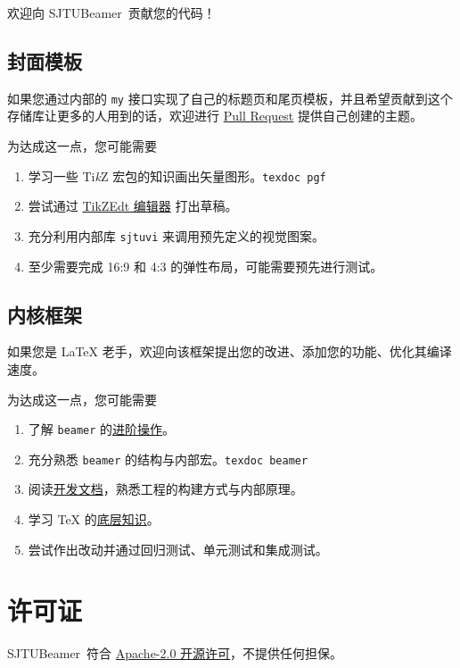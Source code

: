 \documentclass[
    UTF8,
    heading=true,
    12pt,
    a4paper
]{ctexrep}
\def\themename{\textsf{SJTUBeamer}}
\begin{document}
欢迎向 \themename\ 贡献您的代码！

\section{封面模板}

如果您通过内部的 \texttt{my} 接口实现了自己的标题页和尾页模板，并且希望贡献到这个存储库让更多的人用到的话，欢迎进行 \href{https://github.com/sjtug/SJTUBeamer/pulls}{Pull Request} 提供自己创建的主题。

为达成这一点，您可能需要
\begin{enumerate}
  \item 学习一些 Ti\textit{k}Z 宏包的知识画出矢量图形。\texttt{texdoc pgf}
  \item 尝试通过 \href{https://code.google.com/archive/p/tikzedt/downloads}{TikZEdt 编辑器} 打出草稿。
  \item 充分利用内部库 \texttt{sjtuvi} 来调用预先定义的视觉图案。
  \item 至少需要完成 16:9 和 4:3 的弹性布局，可能需要预先进行测试。
\end{enumerate}

\section{内核框架}

如果您是 \LaTeX{} 老手，欢迎向该框架提出您的改进、添加您的功能、优化其编译速度。

为达成这一点，您可能需要
\begin{enumerate}
  \item 了解 \texttt{beamer} 的\href{https://latex-beamer.com/}{进阶操作}。
  \item 充分熟悉 \texttt{beamer} 的结构与内部宏。\texttt{texdoc beamer}
  \item 阅读\href{run:sjtubeamerdevguide.pdf}{开发文档}，熟悉工程的构建方式与内部原理。
  \item 学习 \TeX{} 的\href{https://mirrors.sjtug.sjtu.edu.cn/CTAN/graphics/pgf/contrib/pgfplots/doc/TeX-programming-notes.pdf}{底层知识}。
  \item 尝试作出改动并通过回归测试、单元测试和集成测试。
\end{enumerate}


\chapter*{许可证}

\themename\ 符合 \href{https://github.com/sjtug/SJTUBeamer/blob/main/LICENSE}{Apache-2.0 开源许可}，不提供任何担保。
\end{document}
